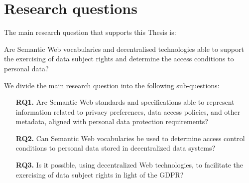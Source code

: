 \section{Research questions}
\label{sec:rqs}

The main research question that supports this Thesis is:

\begin{tcolorbox}[colback=royallavender!20]
Are Semantic Web vocabularies and decentralised technologies able to support the exercising of data subject rights and determine the access conditions to personal data?
\end{tcolorbox}

We divide the main research question into the following sub-questions:

\begin{enumerate}
    \item [\textbf{RQ1.}] Are Semantic Web standards and specifications able to represent information related to privacy preferences, data access policies, and other metadata, aligned with personal data protection requirements?
    \item [\textbf{RQ2.}] Can Semantic Web vocabularies be used to determine access control conditions to personal data stored in decentralized data systems?
    \item [\textbf{RQ3.}] Is it possible, using decentralized Web technologies, to facilitate the exercising of data subject rights in light of the GDPR?
\end{enumerate}
